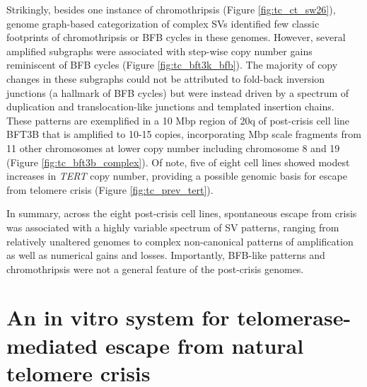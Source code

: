 \documentclass[phd,tocprelim]{cornell}
\renewcommand{\caption}[1]{\singlespacing\hangcaption{#1}\normalspacing}
\begin{document}
Strikingly, besides one instance of chromothripsis (Figure \ref{fig:tc_ct_sw26}), genome graph-based categorization of complex SVs \cite{Hadi2020-um} identified few classic footprints of chromothripsis or BFB cycles in these genomes. However, several amplified subgraphs were associated with step-wise copy number gains reminiscent of BFB cycles (Figure \ref{fig:tc_bft3k_bfb}). The majority of copy changes in these subgraphs could not be attributed to fold-back inversion junctions (a hallmark of BFB cycles) but were instead driven by a spectrum of duplication and translocation-like junctions and templated insertion chains. These patterns are exemplified in a 10 Mbp region of 20q of post-crisis cell line BFT3B that is amplified to 10-15 copies, incorporating Mbp scale fragments from 11 other chromosomes at lower copy number including chromosome 8 and 19 (Figure \ref{fig:tc_bft3b_complex}). Of note, five of eight cell lines showed modest increases in \textit{TERT} copy number, providing a possible genomic basis for escape from telomere crisis (Figure \ref{fig:tc_prev_tert}).

In summary, across the eight post-crisis cell lines, spontaneous escape from crisis was associated with a highly variable spectrum of SV patterns, ranging from relatively unaltered genomes to complex non-canonical patterns of amplification as well as numerical gains and losses. Importantly, BFB-like patterns and chromothripsis were not a general feature of the post-crisis genomes.

\section{An in vitro system for telomerase-mediated escape from natural telomere crisis}


\end{document}
